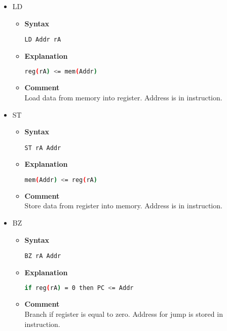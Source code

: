 \begin{itemize}
    \item LD
    \begin{itemize}
        \item \textbf{Syntax}
        \begin{lstlisting}[language={[markII]Assembler}, frame=single]
    LD Addr rA
        \end{lstlisting}
        \item \textbf{Explanation}
        \begin{lstlisting}[language=bash, frame=single]
    reg(rA) <= mem(Addr)
        \end{lstlisting}
        \item \textbf{Comment} \\
    Load data from memory into register. Address is in instruction.
    \end{itemize}

    \item ST
    \begin{itemize}
        \item \textbf{Syntax}
        \begin{lstlisting}[language={[markII]Assembler}, frame=single]
    ST rA Addr
        \end{lstlisting}
        \item \textbf{Explanation}
        \begin{lstlisting}[language=bash, frame=single]
    mem(Addr) <= reg(rA)
        \end{lstlisting}
        \item \textbf{Comment} \\
    Store data from register into memory. Address is in instruction.
    \end{itemize}

    \item BZ
    \begin{itemize}
        \item \textbf{Syntax}
        \begin{lstlisting}[language={[markII]Assembler}, frame=single]
    BZ rA Addr
        \end{lstlisting}
        \item \textbf{Explanation}
        \begin{lstlisting}[language=bash, frame=single]
    if reg(rA) = 0 then PC <= Addr
        \end{lstlisting}
        \item \textbf{Comment} \\
    Branch if register is equal to zero. Address for jump is stored in instruction.
    \end{itemize}


\end{itemize}
